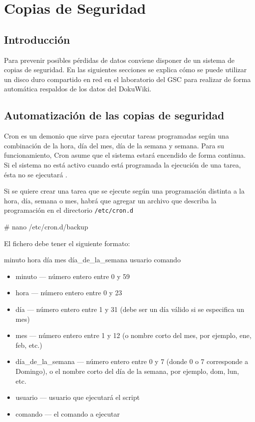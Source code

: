 \section{Copias de Seguridad}
\label{backups}

\subsection{Introducción}

Para prevenir posibles pérdidas de datos conviene disponer de un sistema de copias de seguridad. En las siguientes secciones se explica cómo se puede utilizar un disco duro compartido en red en el laboratorio del GSC para realizar de forma automática respaldos de los datos del DokuWiki.

\subsection{Automatización de las copias de seguridad}

Cron es un demonio que sirve para ejecutar tareas programadas según una combinación de la hora, día del mes, día de la semana y semana. Para su funcionamiento, Cron asume que el sistema estará encendido de forma continua. Si el sistema no está activo cuando está programada la ejecución de una tarea, ésta no se ejecutará \cite{cron}.

Si se quiere crear una tarea que se ejecute según una programación distinta a la hora, día, semana o mes, habrá que agregar un archivo que describa la programación en el directorio \texttt{/etc/cron.d}

\begin{listing}[style=consola, numbers=none]
# nano /etc/cron.d/backup
\end{listing}

El fichero debe tener el siguiente formato:

minuto   hora   día   mes   día\_de\_la\_semana usuario  comando

\begin{itemize}
    \item minuto — número entero entre 0 y 59
    \item hora — número entero entre 0 y 23
    \item día — número entero entre 1 y 31 (debe ser un día válido si se especifica un mes)
    \item mes — número entero entre 1 y 12 (o nombre corto del mes, por ejemplo, ene, feb, etc.)
    \item día\_de\_la\_semana — número entero entre 0 y 7 (donde 0 o 7 corresponde a Domingo), o el nombre corto del día de la semana, por ejemplo, dom, lun, etc.
    \item usuario — usuario que ejecutará el script
    \item comando — el comando a ejecutar
\end{itemize}

